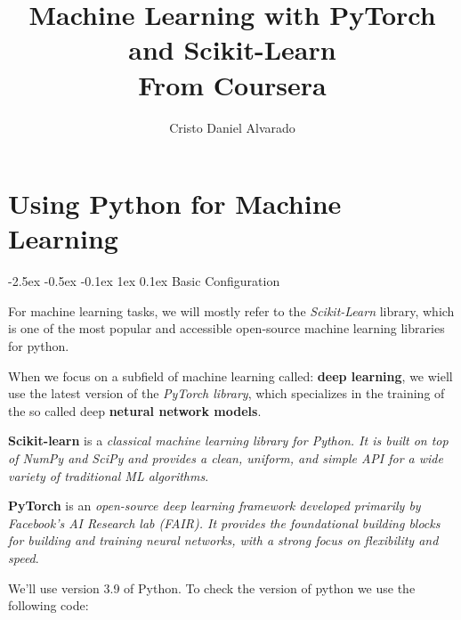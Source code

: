 \documentclass[12pt]{report}
\makeatletter
\renewcommand{\section}{\@startsection{section}{1}{\z@}%
  {-2.5ex \@plus -0.5ex \@minus -0.1ex}%
  {1ex \@plus 0.1ex}%
  {\normalfont\Large\sectionstyle}}
\newcommand{\sectionstyle}[1]{%
  \par\noindent\hrule
  \vspace{0.2ex}%
  {\scshape{#1}\par}%
  \vspace{0.4ex}%
  \hrule
}
\theoremstyle{largebreak}
\makeatother
\begin{document}
    \setlength{\parskip}{5pt}
    \setlength{\parindent}{12pt}
    \title{Machine Learning with PyTorch and Scikit-Learn\\
    
    From Coursera}
    \author{Cristo Daniel Alvarado}
    \maketitle

    \tableofcontents

    \lstlistoflistings

    \newpage

    

    

    \appendix
    
    \chapter{Using Python for Machine Learning}

    \section{Basic Configuration}

    For machine learning tasks, we will mostly refer to the \textit{Scikit-Learn} library, which is one of the most popular and accessible open-source machine learning libraries for python.

    When we focus on a subfield of machine learning called: \textbf{deep learning}, we wiell use the latest version of the \textit{PyTorch library}, which specializes in the training of the so called deep \textbf{netural network models}.

    \begin{mydef}
        \textbf{Scikit-learn} is a \textit{classical machine learning library for Python. It is built on top of NumPy and SciPy and provides a clean, uniform, and simple API for a wide variety of traditional ML algorithms}.

        \textbf{PyTorch} is an \textit{open-source deep learning framework developed primarily by Facebook's AI Research lab (FAIR). It provides the foundational building blocks for building and training neural networks, with a strong focus on flexibility and speed}.
    \end{mydef}

    We'll use version 3.9 of Python. To check the version of python we use the following code:
    
\end{document}
